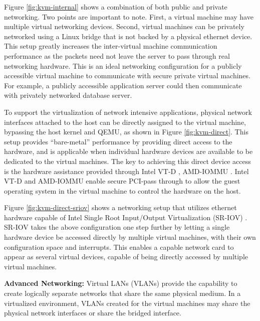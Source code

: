 \begin{enumerate}
Figure \ref{fig:kvm-internal} shows a combination of both public and private networking. Two points are important to note. First, a virtual machine may have multiple virtual networking devices. Second, virtual machines can be privately networked using a Linux bridge that is not backed by a physical ethernet device. This setup greatly increases the inter-virtual machine communication performance as the packets need not leave the server to pass through real networking hardware. This is an ideal networking configuration for a publicly accessible virtual machine to communicate with secure private virtual machines. For example, a publicly accessible application server could then communicate with privately networked database server.



To support the virtualization of network intensive applications, physical network interfaces attached to the host can be directly assigned to the virtual machine, bypassing the host kernel and QEMU, as shown in Figure \ref{fig:kvm-direct}. This setup provides ``bare-metal'' performance by providing direct access to the hardware, and is applicable when individual hardware devices are available to be dedicated to the virtual machines. The key to achieving this direct device access is the hardware assistance provided through Intel VT-D \cite{intelvtd}, AMD-IOMMU \cite{amd-iommu}. Intel VT-D and AMD-IOMMU enable secure PCI-pass through to allow the guest operating system in the virtual machine to control the hardware on the host.



Figure \ref{fig:kvm-direct-sriov} shows a networking setup that utilizes ethernet hardware capable of Intel Single Root Input/Output Virtualization (SR-IOV) \cite{sr-iov_primer}. SR-IOV takes the above configuration one step further by letting a single hardware device be accessed directly by multiple virtual machines, with their own configuration space and interrupts. This enables a capable network card to appear as several virtual devices, capable of being directly accessed by multiple virtual machines.


\textbf{Advanced Networking: }  Virtual LANs (VLANs) provide the capability to create logically separate networks that share the same physical medium. In a virtualized environment, VLANs created for the virtual machines may share the physical network interfaces or share the bridged interface.


\end{enumerate}

